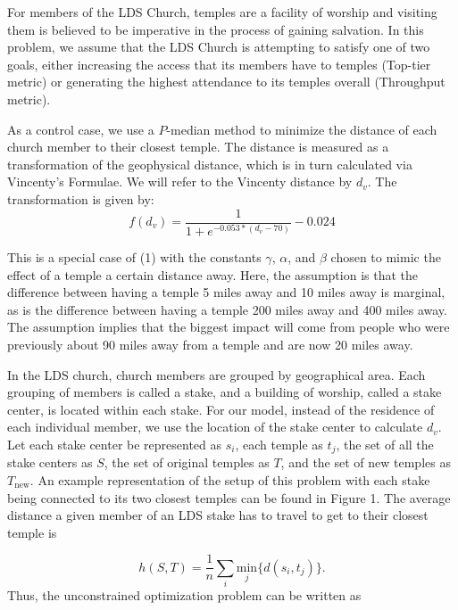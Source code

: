 \documentclass[twoside,twocolumn]{article}
\begin{document}
For members of the LDS Church, temples are a facility of worship and visiting them is believed to be imperative in the process of gaining salvation.
In this problem, we assume that the LDS Church is attempting to satisfy one of two goals, either increasing the access that its members have to temples (Top-tier metric) or generating the highest attendance to its temples overall (Throughput metric).

As a control case, we use a $P$-median method to minimize the distance of each church member to their closest temple.
The distance is measured as a transformation of the geophysical distance, which is in turn calculated via Vincenty's Formulae. %
We will refer to the Vincenty distance by $d_{v}$. %
The transformation is given by:
\begin{equation*}
f(d_{v}) = \frac{1}{1+e^{-0.053*(d_{v} - 70)}} - 0.024
\end{equation*}

This is a special case of (1) with the constants $\gamma$, $\alpha$, and $\beta$ chosen to mimic the effect of a temple a certain distance away.
Here, the assumption is that the difference between having a temple 5 miles away and 10 miles away is marginal, as is the difference between having a temple 200 miles away and 400 miles away.
The assumption implies that the biggest impact will come from people who were previously about 90 miles away from a temple and are now 20 miles away.

In the LDS church, church members are grouped by geographical area.
Each grouping of members is called a stake, and a building of worship, called a stake center, is located within each stake.
For our model, instead of the residence of each individual member, we use the location of the stake center to calculate $d_{v}$.
Let each stake center be represented as $s_i$, each temple as $t_j$, the set of all the stake centers as $S$, the set of original temples as $T$, and the set of new temples as $T_{\text{new}}$. %
An example representation of the setup of this problem with each stake being connected to its two closest temples can be found in Figure 1.
The average distance a given member of an LDS stake has to travel to get to their closest temple is

\begin{equation*}
	h(S,T) = \frac{1}{n} \sum_i \underset{j}{\text{min}}\{d(s_i,t_j)\}.
\end{equation*}
Thus, the unconstrained optimization problem can be written as
\end{document}
